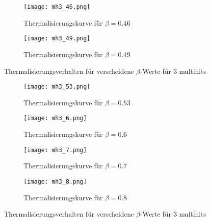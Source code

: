 \documentclass[12pt]{article}
\begin{document}
\begin{figure}[H]\hspace*{-1.5cm}
    \begin{subfigure}{0.4\textwidth}
    \texttt{[image: mh3\_46.png]}
    \caption{Thermalisierungskurve für $\beta=0.46$}
    \end{subfigure}
    \hfill
    \begin{subfigure}{0.4\textwidth}
    \hspace*{-0.8cm}
    \texttt{[image: mh3\_49.png]}
    \caption{Thermalisierungskurve für $\beta=0.49$}
    \end{subfigure}
    \hfill
    \caption{Thermalisierungsverhalten für verscheidene $\beta$-Werte für 3 multihits}
\end{figure}

\begin{figure}[H]
    \hspace*{-1.5cm}
    \begin{subfigure}{0.4\textwidth}
    \texttt{[image: mh3\_53.png]}
    \caption{Thermalisierungskurve für $\beta=0.53$}
    \end{subfigure}
    \hfill
    \begin{subfigure}{0.4\textwidth}
    \hspace*{-0.8cm}
    \texttt{[image: mh3\_6.png]}
    \caption{Thermalisierungskurve für $\beta=0.6$}
    \end{subfigure}
    \hfill
    \hspace*{-1.5cm}
    \begin{subfigure}{0.4\textwidth}
    \texttt{[image: mh3\_7.png]}
    \caption{Thermalisierungskurve für $\beta=0.7$}
    \end{subfigure}
    \hfill
    \begin{subfigure}{0.4\textwidth}
    \hspace*{-0.8cm}
    \texttt{[image: mh3\_8.png]}
    \caption{Thermalisierungskurve für $\beta=0.8$}
    \end{subfigure}
    \hfill
    \caption{Thermalisierungsverhalten für verscheidene $\beta$-Werte für 3 multihits}
    \end{figure}
\end{document}
